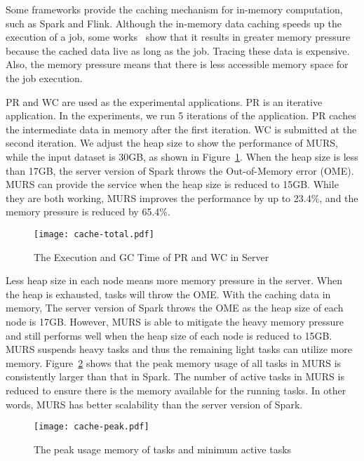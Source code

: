 Some frameworks provide the caching mechanism for in-memory computation, such as Spark and Flink. Although the in-memory data caching speeds up the execution of a job, some works~\cite{bu:bloat, nguyen2015facade} show that it results in greater memory pressure because the cached data live as long as the job. Tracing these data is expensive. Also, the memory pressure means that there is less accessible memory space for the job execution.

PR and WC are used as the experimental applications. PR is an iterative application. In the experiments, we run 5 iterations of the application. PR caches the intermediate data in memory after the first iteration. WC is submitted at the second iteration. We adjust the heap size to show the performance of MURS, while the input dataset is 30GB, as shown in Figure~\ref{fig:cache-total}. When the heap size is less than 17GB, the server version of Spark throws the Out-of-Memory error (OME). MURS can provide the service when the heap size is reduced to 15GB. While they are both working, MURS improves the performance by up to 23.4\%, and the memory pressure is reduced by 65.4\%.

\begin{figure}[!t]
\centering
\texttt{[image: cache-total.pdf]}
\caption{The Execution and GC Time of PR and WC in Server}
\label{fig:cache-total}
\end{figure}

Less heap size in each node means more memory pressure in the server. When the heap is exhausted, tasks will throw the OME. With the caching data in memory, The server version of Spark throws the OME as the heap size of each node is 17GB. However, MURS is able to mitigate the heavy memory pressure and still performs well when the heap size of each node is reduced to 15GB. MURS suspends heavy tasks and  thus the remaining light tasks can utilize more memory. Figure~\ref{fig:cache-peak} shows that the peak memory usage of all tasks in MURS is consistently larger than that in Spark. The number of active tasks in MURS is reduced to ensure there is the memory available for the running tasks. In other words, MURS has better scalability than the server version of Spark.

\begin{figure}[!t]
\centering
\texttt{[image: cache-peak.pdf]}
\caption{The peak usage memory of tasks and minimum active tasks}
\label{fig:cache-peak}
\end{figure}

